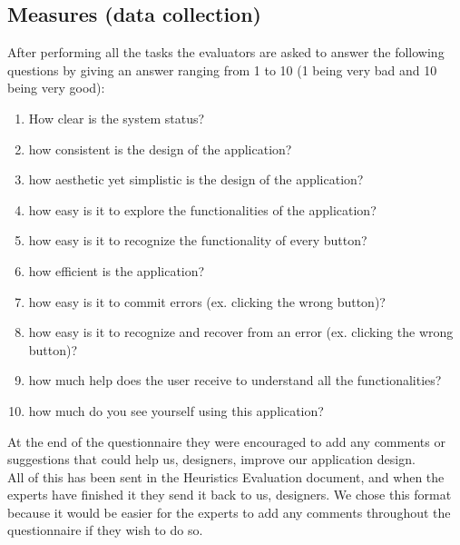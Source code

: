 \documentclass{article}
\begin{document}
\subsection{Measures (data collection)}
After performing all the tasks the evaluators are asked to answer the following questions by giving an answer ranging from 1 to 10 (1 being very bad and 10 being very good):
\begin{enumerate}
    \item How clear is the system status?
    \item how consistent is the design of the application?
    \item how aesthetic yet simplistic is the design of the application?
    \item how easy is it to explore the functionalities of the application?
    \item how easy is it to recognize the functionality of every button?
    \item how efficient is the application?
    \item how easy is it to commit errors (ex. clicking the wrong button)?
    \item how easy is it to recognize and recover from an error (ex. clicking the wrong button)?
    \item how much help does the user receive to understand all the functionalities?
    \item how much do you see yourself using this application?
\end{enumerate}
At the end of the questionnaire they were encouraged to add any comments or suggestions that could help us, designers, improve our application design.\\

All of this has been sent in the Heuristics Evaluation document, and when the experts have finished it they send it back to us, designers.
We chose this format because it would be easier for the experts to add any comments throughout the questionnaire if they wish to do so.\\
\end{document}
